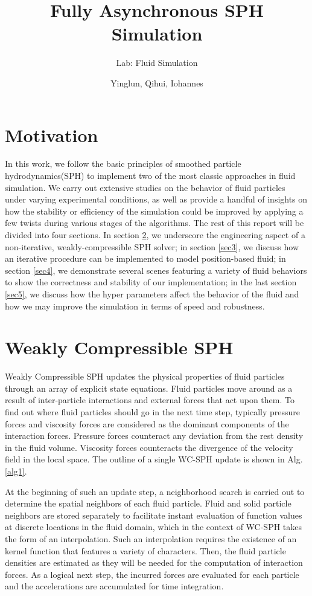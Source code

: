 \documentclass[
	11pt, 
	DIV10,
	ngerman,
	a4paper, 
	oneside, 
	headings=normal, 
	captions=tableheading,
	final, 
	numbers=noenddot
]{scrartcl}
\title{Fully Asynchronous SPH Simulation}
\subtitle{\vspace{0.5cm}Lab: Fluid Simulation}
\author{Yinglun, Qihui, Iohannes}
\begin{document}
\maketitle


\section{Motivation}

In this work, we follow the basic principles of smoothed particle hydrodynamics(SPH) to implement two of the most classic approaches in fluid simulation. We carry out extensive studies on the behavior of fluid particles under varying experimental conditions, as well as provide a handful of insights on how the stability or efficiency of the simulation could be improved by applying a few twists during various stages of the algorithms. The rest of this report will be divided into four sections. In section \ref{sec2}, we underscore the engineering aspect of a non-iterative, weakly-compressible SPH solver; in section \ref{sec3}, we discuss how an iterative procedure can be implemented to model position-based fluid; in section \ref{sec4}, we demonstrate several scenes featuring a variety of fluid behaviors to show the correctness and stability of our implementation; in the last section \ref{sec5}, we discuss how the hyper parameters affect the behavior of the fluid and how we may improve the simulation in terms of speed and robustness.


\section{Weakly Compressible SPH}
\label{sec2}

Weakly Compressible SPH updates the physical properties of fluid particles through an array of explicit state equations. Fluid particles move around as a result of inter-particle interactions and external forces that act upon them. To find out where fluid particles should go in the next time step, typically pressure forces and viscosity forces are considered as the dominant components of the interaction forces. Pressure forces counteract any deviation from the rest density in the fluid volume. Viscosity forces counteracts the divergence of the velocity field in the local space. The outline of a single WC-SPH update is shown in Alg. \ref{alg1}.

At the beginning of such an update step, a neighborhood search is carried out to determine the spatial neighbors of each fluid particle. Fluid and solid particle neighbors are stored separately to facilitate instant evaluation of function values at discrete locations in the fluid domain, which in the context of WC-SPH takes the form of an interpolation. Such an interpolation requires the existence of an kernel function that features a variety of characters. Then, the fluid particle densities are estimated as they will be needed for the computation of interaction forces. As a logical next step, the incurred forces are evaluated for each particle and the accelerations are accumulated for time integration.
\end{document}
